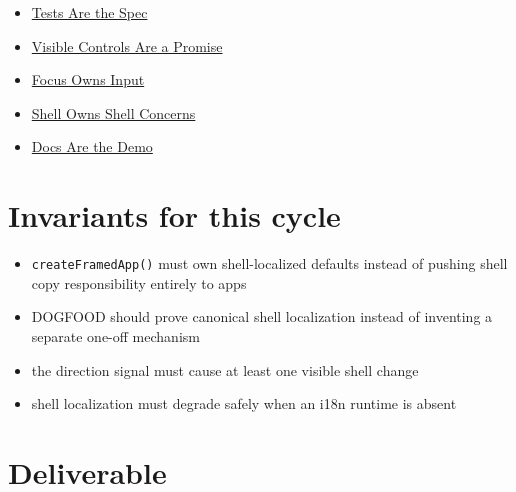 \begin{itemize}
\tightlist
\item
  \href{https://github.com/flyingrobots/bijou/blob/cbd70612140e7a450d764b3c7be1c6af878b99bc/docs/invariants/tests-are-the-spec.md}{Tests Are the Spec}
\item
  \href{https://github.com/flyingrobots/bijou/blob/cbd70612140e7a450d764b3c7be1c6af878b99bc/docs/invariants/visible-controls-are-a-promise.md}{Visible Controls Are a Promise}
\item
  \href{https://github.com/flyingrobots/bijou/blob/cbd70612140e7a450d764b3c7be1c6af878b99bc/docs/invariants/focus-owns-input.md}{Focus Owns Input}
\item
  \href{https://github.com/flyingrobots/bijou/blob/cbd70612140e7a450d764b3c7be1c6af878b99bc/docs/invariants/shell-owns-shell-concerns.md}{Shell Owns Shell Concerns}
\item
  \href{https://github.com/flyingrobots/bijou/blob/cbd70612140e7a450d764b3c7be1c6af878b99bc/docs/invariants/docs-are-the-demo.md}{Docs Are the Demo}
\end{itemize}

\section{Invariants for this cycle}\label{record-194-invariants-for-this-cycle}

\begin{itemize}
\tightlist
\item
  \texttt{c\allowbreak{}r\allowbreak{}e\allowbreak{}a\allowbreak{}t\allowbreak{}e\allowbreak{}F\allowbreak{}r\allowbreak{}a\allowbreak{}m\allowbreak{}e\allowbreak{}d\allowbreak{}A\allowbreak{}p\allowbreak{}p\allowbreak{}(\allowbreak{})} must own shell-localized defaults instead of pushing shell copy responsibility entirely to apps
\item
  DOGFOOD should prove canonical shell localization instead of inventing a separate one-off mechanism
\item
  the direction signal must cause at least one visible shell change
\item
  shell localization must degrade safely when an i18n runtime is absent
\end{itemize}

\section{Deliverable}\label{record-194-deliverable}

